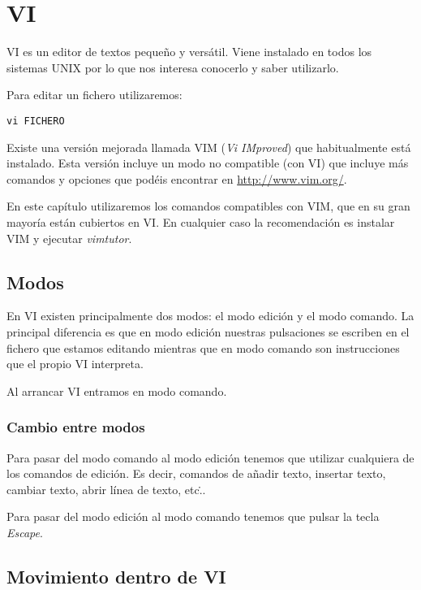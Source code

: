 \chapter{VI}
\label{cha:VI}

VI es un editor de textos pequeño y versátil. Viene instalado en todos los
sistemas UNIX por lo que nos interesa conocerlo y saber utilizarlo.

Para editar un fichero utilizaremos:

\begin{lstlisting}
vi FICHERO
\end{lstlisting}

Existe una versión mejorada llamada VIM (\emph{Vi IMproved}) que habitualmente
está instalado. Esta versión incluye un modo no compatible (con VI) que
incluye más comandos y opciones que podéis encontrar en
\url{http://www.vim.org/}.

En este capítulo utilizaremos los comandos compatibles con VIM, que en su gran
mayoría están cubiertos en VI. En cualquier caso la recomendación es instalar
VIM y ejecutar \emph{vimtutor}.

\section{Modos} %
\label{sec:Modos}

En VI existen principalmente dos modos: el modo edición y el modo comando. La
principal diferencia es que en modo edición nuestras pulsaciones se escriben en
el fichero que estamos editando mientras que en modo comando son instrucciones
que el propio VI interpreta.

Al arrancar VI entramos en modo comando.

\subsection{Cambio entre modos} %
\label{sub:Cambio entre modos}

Para pasar del modo comando al modo edición tenemos que utilizar cualquiera de
los comandos de edición. Es decir, comandos de añadir texto, insertar texto,
cambiar texto, abrir línea de texto, etc\...

Para pasar del modo edición al modo comando tenemos que pulsar la tecla
\emph{Escape}.



\section{Movimiento dentro de VI} %
\label{sec:Movimiento dentro de VI}

